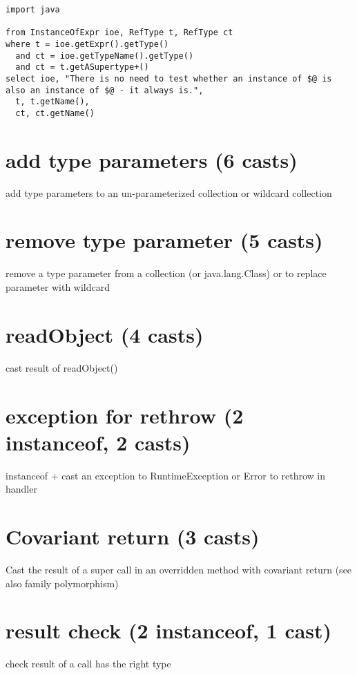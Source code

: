 \lstset{language=ql,label= ,caption= ,captionpos=b,numbers=none}
\begin{lstlisting}
import java

from InstanceOfExpr ioe, RefType t, RefType ct
where t = ioe.getExpr().getType()
  and ct = ioe.getTypeName().getType()
  and ct = t.getASupertype+()
select ioe, "There is no need to test whether an instance of $@ is also an instance of $@ - it always is.",
  t, t.getName(),
  ct, ct.getName()
\end{lstlisting}

\section{add type parameters (6 casts)}
\label{sec:orge3b84b3}
add type parameters to an un-parameterized collection or wildcard collection 

\section{remove type parameter (5 casts)}
\label{sec:orgdccbc41}
remove a type parameter from a collection (or java.lang.Class) or to replace parameter with wildcard 

\section{readObject (4 casts)}
\label{sec:org1c30fc6}
cast result of readObject() 

\section{exception for rethrow (2 instanceof, 2 casts)}
\label{sec:orgcdb3caa}

instanceof + cast an exception to RuntimeException or Error to rethrow in handler 

\section{Covariant return (3 casts)}
\label{sec:org46f23f9}

Cast the result of a super call in an overridden method with covariant return 
(see also family polymorphism) 

\section{result check (2 instanceof, 1 cast)}
\label{sec:org7367720}
check result of a call has the right type 

